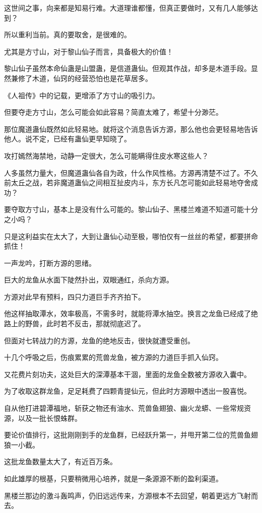 \begin{this_body}
这世间之事，向来都是知易行难。大道理谁都懂，但真正要做时，又有几人能够达到？

所以重利当前。真的要取舍，是很难的。

尤其是方寸山，对于黎山仙子而言，具备极大的价值！

黎山仙子虽然本命仙蛊是山盟蛊，是信道蛊仙。但观其作战，却多是木道手段。显然兼修了木道，仙窍的经营恐怕也是花草居多。

《人祖传》中的记载，更增添了方寸山的吸引力。

但要夺走方寸山，怎么可能会如此容易？简直太难了，希望十分渺茫。

那位魔道蛊仙既然如此轻易地。就将这个消息告诉方源，那么他也会更轻易地告诉他人。说不定，已经有蛊仙更早知晓了。

攻打嫣然海禁地，动静一定很大，怎么可能瞒得住皮水寒这些人？

人多虽然力量大，但魔道蛊仙各自为政，什么作风性格。方源再清楚不过了。不久前太丘之战，若非魔道蛊仙之间相互扯皮内斗，东方长凡怎可能如此轻易地夺舍成功？

要夺取方寸山，基本上是没有什么可能的。黎山仙子、黑楼兰难道不知道可能十分之小吗？

只是这利益实在太大了，大到让蛊仙心动至极，哪怕仅有一丝丝的希望，都要拼命抓住！

一声龙吟，打断方源的思绪。

巨大的龙鱼从水面下陡然扑出，双眼通红，杀向方源。

方源对此早有预料，四只力道巨手齐齐拍下。

他这样抽取潭水，效率极高，不需多时，就能将潭水抽空。换言之龙鱼已经成了绝路上的野兽，此时若不反击，那就彻底迟了。

但面对七转战力的方源，龙鱼的绝地反击，很快就遭受重创。

十几个呼吸之后，伤痕累累的荒兽龙鱼，被方源的力道巨手抓入仙窍。

又花费片刻功夫，这处巨大的深潭基本干涸，里面的龙鱼全数被方源收入囊中。

为了收取这群龙鱼，足足耗费了四颗青提仙元，但此时方源眼中透出一股喜悦。

自从他打进碧潭福地，斩获之物还有油水、荒兽鱼翅狼、幽火龙蟒、一些常规资源，以及一批长恨蛛群。

要论价值排行，这批刚刚到手的龙鱼群，已经跃升第一，并甩开第二位的荒兽鱼翅狼一小截。

这批龙鱼数量太大了，有近百万条。

如此雄厚的根基，只要稍微用心培养，就是一条源源不断的盈利渠道。

黑楼兰那边的激斗轰鸣声，仍旧远远传来，方源根本不去回望，朝着更远方飞射而去。


\end{this_body}

